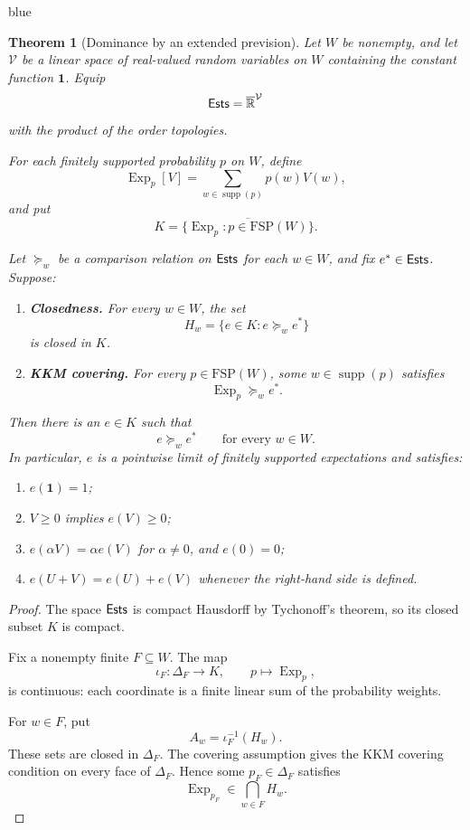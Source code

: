 \documentclass[11pt]{article}
\newtheorem{theorem}{Theorem}[section]
\theoremstyle{definition}
\theoremstyle{remark}
\newcommand{\one}{\mathbf 1}
\newcommand{\supp}{\operatorname{supp}}
\newcommand{\Exp}{\operatorname{Exp}}
\newenvironment{AIwritten}{\begin{color}{blue}}{\end{color}}
\begin{document}
\begin{AIwritten}
\begin{theorem}[Dominance by an extended prevision]
	Let $W$ be nonempty, and let $\mathcal V$ be a
	linear space of real-valued random variables on $W$
	containing the constant function $\one$.
	Equip
	\[
	\mathsf{Ests}=\overline{\mathbb R}^{\mathcal V}
	\]
	with the product of the order topologies.
	
	For each finitely supported probability $p$ on $W$,
	define
	\[
	\Exp_p[V]
	=
	\sum_{w\in\supp(p)}p(w)V(w),
	\]
	and put
	\[
	K=\overline{
		\{\Exp_p:p\in\mathrm{FSP}(W)\}
	}.
	\]
	
	Let $\succeq_w$ be a comparison relation on $\mathsf{Ests}$
	for each $w\in W$, and fix $e^*\in\mathsf{Ests}$.
	Suppose:
	\begin{enumerate}
		\item \textbf{Closedness.}
		For every $w\in W$, the set
		\[
		H_w=\{e\in K:e\succeq_w e^*\}
		\]
		is closed in $K$.
		
		\item \textbf{KKM covering.}
		For every $p\in\mathrm{FSP}(W)$, some
		$w\in\supp(p)$ satisfies
		\[
		\Exp_p\succeq_w e^*.
		\]
	\end{enumerate}
	
	Then there is an $e\in K$ such that
	\[
	e\succeq_w e^*
	\qquad\text{for every }w\in W.
	\]
	In particular, $e$ is a pointwise limit of
	finitely supported expectations and satisfies:
	\begin{enumerate}
		\item $e(\one)=1$;
		\item $V\ge0$ implies $e(V)\ge0$;
		\item $e(\alpha V)=\alpha e(V)$ for
		$\alpha\ne0$, and $e(0)=0$;
		\item $e(U+V)=e(U)+e(V)$ whenever the
		right-hand side is defined.
	\end{enumerate}
\end{theorem}

\begin{proof}
	The space $\mathsf{Ests}$ is compact Hausdorff by
	Tychonoff's theorem, so its closed subset $K$
	is compact.
	
	Fix a nonempty finite $F\subseteq W$.
	The map
	\[
	\iota_F:\Delta_F\to K,
	\qquad p\mapsto\Exp_p,
	\]
	is continuous: each coordinate is a finite
	linear sum of the probability weights.
	
	For $w\in F$, put
	\[
	A_w=\iota_F^{-1}(H_w).
	\]
	These sets are closed in $\Delta_F$.
	The covering assumption gives the KKM covering
	condition on every face of $\Delta_F$.
	Hence some $p_F\in\Delta_F$ satisfies
	\[
	\Exp_{p_F}\in\bigcap_{w\in F}H_w.
	\]
	

\end{proof}
\end{AIwritten}
\end{document}
